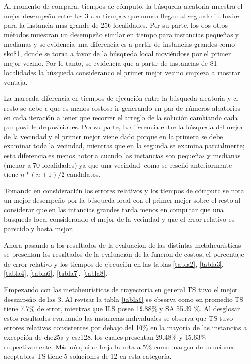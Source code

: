 \documentclass{ci5652}
\begin{document}
Al momento de comparar tiempos de cómputo, la búsqueda aleatoria muestra el mejor desempeño entre los 3 con tiempos que nunca llegan al segundo inclusive para la instancia más grande de 256 localidades. Por su parte, los dos otros métodos muestran un desempeño similar en tiempo para instancias pequeñas y medianas y se evidencia una diferencia es a partir de instancias grandes como sko81, donde se torna a favor de la búsqueda local moviéndose por el primer mejor vecino. Por lo tanto, se evidencia que a partir de instancias de 81 localidades la búsqueda considerando el primer mejor vecino empieza a mostrar ventaja.

La marcada diferencia en tiempos de ejecución entre la búsqueda aleatoria y el resto se debe a que es menos costoso ir generando un par de números aleatorios en cada iteración a tener que recorrer el arreglo de la solución cambiando cada par posible de posiciones. Por su parte, la diferencia entre la búsqueda del mejor de la vecindad y el primer mejor viene dado porque en la primera se debe examinar toda la vecindad, mientras que en la segunda se examina parcialmente; esta diferencia es menos notoria cuando las instancias son pequeñas y medianas (menor a 70 localidades) ya que una vecindad, como se reseñó anteriormente tiene $n*(n+1)/2$ candidatos.

Tomando en consideración los errores relativos y los tiempos de cómputo se nota un mejor desempeño por la búsqueda local con el primer mejor sobre el resto al considerar que en las intancias grandes tarda menos en computar que una busqueda local considerando el mejor de la vecindad y que el error relativo es parecido y hasta mejor.

Ahora pasando a los resultados de la evaluación de las distintas metaheurísticas se presentan los resultados de la evaluación de la función de costos, el porcentaje de error relativo y los tiempos de ejecución en las tablas \ref{tabla2}, \ref{tabla3}, \ref{tabla4}, \ref{tabla6}, \ref{tabla7}, \ref{tabla8}.

Empezando con las metaheurísticas de trayectoria en general TS tuvo el mejor desempeño de las 3. Al revisar la tabla \ref{tabla6} se observa como en promedio TS tiene 7.7\% de error, mientras que ILS posee 19.88\% y SA 55.39 \%. Al desglosar estos resultados evaluando las instancias individuales se observa que TS tuvo errores relativos consistentes por debajo del 10\% en la mayoría de las instancias a excepción de che25a y esc128, los cuales presentan 29.48\% y 15.63\% respectivamente. Más aún, si se baja la cota a 5\% como margen de soluciones aceptables TS tiene 5 soluciones de 12 en esta categoría.
\end{document}
